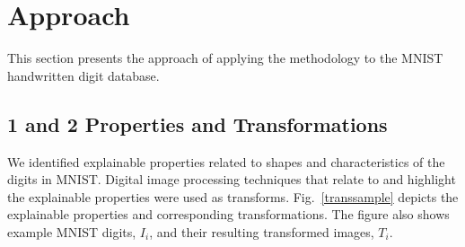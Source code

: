 \documentclass[conference]{IEEEtran}
\begin{document}
\section{Approach}

This section presents the approach of applying the methodology to the MNIST handwritten digit database. 

\subsection{1 and 2 Properties and Transformations}

We identified explainable properties related to shapes and characteristics of the digits in MNIST.  Digital image processing techniques that relate to and highlight the explainable properties were used as transforms.  Fig.~\ref{transsample} depicts the explainable properties and corresponding transformations.  The figure also shows example MNIST digits, $I_i$, and their resulting transformed images, $T_i$.
\end{document}
